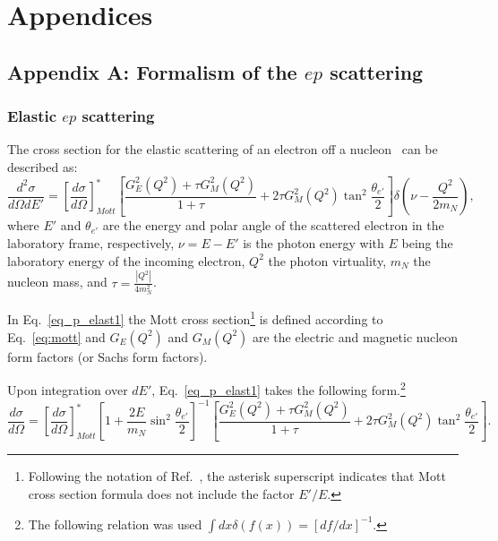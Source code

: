 
\appendix


    \makeatletter
   \renewcommand{\theequation}{\thechapter.\@arabic\c@equation}
    \makeatother
\chapter*{Appendices}
\label{app}




\renewcommand{\thesection}{A}
    \makeatletter
   \renewcommand{\theequation}{\thesection.\@arabic\c@equation}
    \makeatother
\section*{Appendix A: Formalism of the $ep$ scattering}
\label{app_formalism}

\subsection*{Elastic $ep$ scattering}

The cross section for the elastic scattering of an electron off a nucleon~\cite{Halzen:1984mc,Close:1979bt,Povh:1995mua} can be described as:
\begin{equation}
\frac{d^{2}\sigma}{d\Omega d E'} = \left [ \frac{d\sigma}{d\Omega} \right ]^{*}_{Mott}  \left [ \frac{G_{E}^{2}(Q^{2}) + \tau G_{M}^{2}(Q^{2}) }{1+\tau} + 2\tau G_{M}^{2}(Q^{2}) \tan^{2}{\frac{\theta_{e'}}{2}} \right ] \delta\left ( \nu - \frac{Q^{2}}{2m_{N}} \right),\label{eq_p_elast1}
\end{equation}
where $E'$ and $\theta_{e'}$ are the energy and polar angle of the scattered electron in the laboratory frame, respectively, $\nu = E-E'$ is the photon energy with $E$ being the laboratory energy of the incoming electron, $Q^{2}$ the photon virtuality, $m_{N}$ the nucleon mass, and $\tau = \frac{|Q^{2}|}{4m_{N}^{2}}$.

In Eq.~\eqref{eq_p_elast1} the Mott cross section\footnote[7]{Following the notation of  Ref.~\cite{Povh:1995mua}, the asterisk superscript indicates that Mott cross section formula does not include the factor $E'/E$.} is defined according to Eq.~\eqref{eq:mott} and $G_{E}(Q^{2})$ and $G_{M}(Q^{2})$ are the electric and magnetic nucleon form factors (or Sachs form factors).


Upon integration over $d E'$, Eq.~\eqref{eq_p_elast1} takes the following form.\footnote[8]{The following relation was used $\int dx \delta\left ( f(x) \right ) = \left [ df/dx \right ]^{-1}$.}
\begin{equation}
\frac{d\sigma}{d\Omega} = \left [ \frac{d\sigma}{d\Omega} \right ]^{*}_{Mott} \left [1+\frac{2E}{m_{N}}\sin^{2} \frac{\theta_{e'}}{2} \right ]^{-1}   \left [ \frac{G_{E}^{2}(Q^{2}) + \tau G_{M}^{2}(Q^{2}) }{1+\tau} + 2\tau G_{M}^{2}(Q^{2}) \tan^{2}{\frac{\theta_{e'}}{2}} \right ].\label{eq_p_elast2}
\end{equation}

